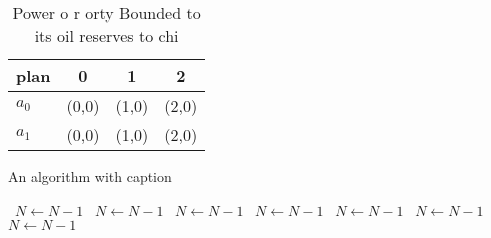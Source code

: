 \documentclass[a4paper]{article}
\begin{document}
\begin{table}
\begin{adjustbox}{width=0.5\columnwidth}
\begin{tabular}{|l|l|l|l|}
\hline
\textbf{plan} & \multicolumn{1}{c|}{\textbf{0}} & \multicolumn{1}{c|}{\textbf{1}} & \multicolumn{1}{c|}{\textbf{2}} \\ \hline
\textbf{$a_0$}  & (0,0) & (1,0) & (2,0) \\ \hline
\textbf{$a_1$}  & (0,0) & (1,0) & (2,0) \\ \hline
\end{tabular}
\end{adjustbox}
\caption{Power o r orty Bounded to its oil reserves to chi
}
\end{table}

\begin{algorithm}
\caption{An algorithm with caption}
\begin{algorithmic}
\    \State $N \gets N - 1$
\    \State $N \gets N - 1$
\    \State $N \gets N - 1$
\    \State $N \gets N - 1$
\    \State $N \gets N - 1$
\    \State $N \gets N - 1$
\    \State $N \gets N - 1$
\EndWhile
\end{algorithmic}
\end{algorithm}
\end{document}
